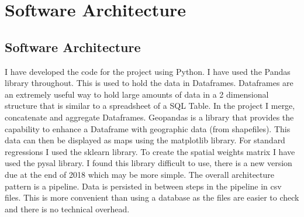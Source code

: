 
\chapter{Software Architecture} %

\label{Chapter4} %





\section{Software Architecture}
I have developed the code for the project using Python. I have used the Pandas library throughout. This is used to hold the data in Dataframes. Dataframes are an extremely useful way to hold large amounts of data in a 2 dimensional structure that is similar to a spreadsheet of a SQL Table. In the project I merge, concatenate and aggregate Dataframes.
Geopandas is a library that provides the capability to enhance a Dataframe with geographic data (from shapefiles). This data can then be displayed as maps using the matplotlib library.
For standard regressions I used the sklearn library.
To create the spatial weights matrix I have used the pysal library. I found this library difficult to use, there is a new version due at the end of 2018 which may be more simple.
The overall architecture pattern is a pipeline. Data is persisted in between steps in the pipeline in csv files. This is more convenient than using a database as the files are easier to check and there is no technical overhead. 






